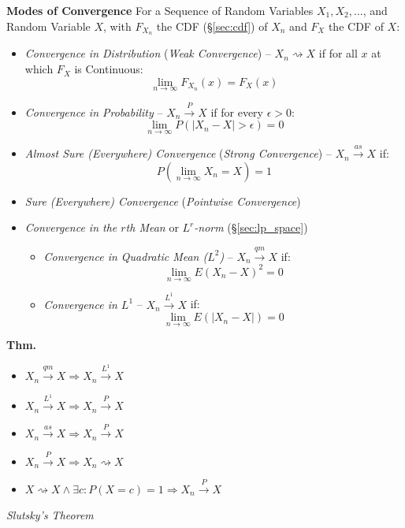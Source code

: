\textbf{Modes of Convergence}
For a Sequence of Random Variables $X_1, X_2, \ldots$, and Random Variable $X$,
with $F_{X_n}$ the CDF (\S\ref{sec:cdf}) of $X_n$ and $F_X$ the CDF of $X$:
\begin{itemize}
  \item \emph{Convergence in Distribution} (\emph{Weak Convergence}) --
    $X_n \rightsquigarrow X$ if for all $x$ at which $F_X$ is Continuous:
    \[
      \lim_{n\rightarrow\infty} F_{X_n}(x) = F_X(x)
    \]
  \item \emph{Convergence in Probability} -- $X_n \xrightarrow{P} X$ if for
    every $\epsilon > 0$:
    \[
      \lim_{n\rightarrow\infty}P(|X_n - X| > \epsilon) = 0
    \]
  \item \emph{Almost Sure (Everywhere) Convergence} (\emph{Strong Convergence})
    -- $X_n \xrightarrow{as} X$ if:
    \[
      P(\lim_{n\rightarrow\infty}X_n = X) = 1
    \]
  \item \emph{Sure (Everywhere) Convergence} (\emph{Pointwise Convergence})
  \item \emph{Convergence in the $r$th Mean} or \emph{$L^r$-norm}
    (\S\ref{sec:lp_space})
    \begin{itemize}
      \item \emph{Convergence in Quadratic Mean ($L^2$)} --
        $X_n \xrightarrow{qm} X$ if:
        \[
          \lim_{n\rightarrow\infty} E(X_n - X)^2 = 0
        \]
      \item \emph{Convergence in $L^1$} -- $X_n \xrightarrow{L^1} X$ if:
        \[
          \lim_{n\rightarrow\infty} E(|X_n - X|) = 0
        \]
    \end{itemize}
\end{itemize}

\textbf{Thm.}
\begin{itemize}
  \item $X_n \xrightarrow{qm} X \Rightarrow X_n \xrightarrow{L^1} X$
  \item $X_n \xrightarrow{L^1} X \Rightarrow X_n \xrightarrow{P} X$
  \item $X_n \xrightarrow{as} X \Rightarrow X_n \xrightarrow{P} X$
  \item $X_n \xrightarrow{P} X \Rightarrow X_n \rightsquigarrow X$
  \item $X \rightsquigarrow X \wedge \exists c : P(X = c) = 1 \Rightarrow
    X_n \xrightarrow{P} X$
\end{itemize}

\emph{Slutsky's Theorem}




